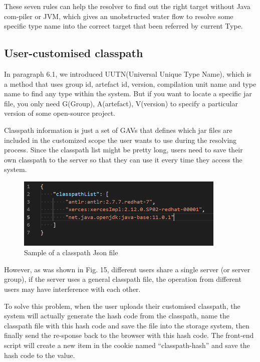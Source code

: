 \documentclass[runningheads]{llncs}
\begin{document}
These seven rules can help the resolver to find out the right target without Java com-piler or JVM, which gives an unobstructed water flow to resolve some specific type name into the correct target that been referred by current Type.

\subsection{User-customised classpath}
In paragraph 6.1, we introduced UUTN(Universal Unique Type Name), which is a method that uses group id, artefact id, version, compilation unit name and type name to find any type within the system. But if you want to locate a specific jar file, you only need G(Group), A(artefact), V(version) to specify a particular version of some open-source project.

Classpath information is just a set of GAVs that defines which jar files are included in the customized scope the user wants to use during the resolving process. Since the classpath list might be pretty long, users need to save their own classpath to the server so that they can use it every time they access the system.


\begin{figure}[H]
	\centering
	\includegraphics[width=10cm]{pic/classpath-json.png}
	\caption{Sample of a classpath Json file}
	\label{Sample of a classpath Json file}
\end{figure}

However, as was shown in Fig. 15, different users share a single server (or server group), if the server uses a general classpath file, the operation from different users may have interference with each other.

To solve this problem, when the user uploads their customised classpath, the system will actually generate the hash code from the classpath, name the classpath file with this hash code and save the file into the storage system, then finally send the re-sponse back to the browser with this hash code. The front-end script will create a new item in the cookie named “classpath-hash” and save the hash code to the value.
\end{document}
